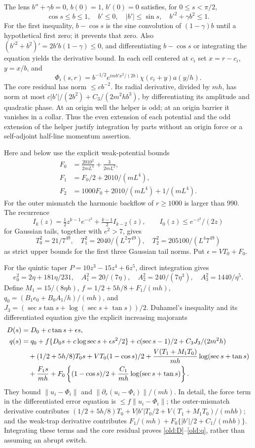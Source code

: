 \documentclass[11pt]{article}
\theoremstyle{definition}\newtheorem{definition}[theorem]{Definition}
\theoremstyle{remark}\newtheorem{remark}[theorem]{Remark}
\begin{document}
The lens $b''+\gamma b=0$, $b(0)=1$, $b'(0)=0$ satisfies, for
$0\leq s<\pi/2$,
\[
 \cos s\leq b\leq1,\quad b'\leq0,\quad |b'|\leq\sin s,
 \quad b'^2+\gamma b^2\leq1.
\]
For the first inequality, $b-\cos s$ is the sine convolution of
$(1-\gamma)b$ until a hypothetical first zero; it prevents that zero.
Also $(b'^2+b^2)'=2b'b(1-\gamma)\leq0$, and differentiating $b-\cos s$
or integrating the equation yields the derivative bound.
In each cell centered at $c_i$ set $x=r-c_i$, $y=x/b$, and
\[
 \Phi_i(s,r)=b^{-1/2}e^{im b'x^2/(2b)}
             \chi(c_i+y)a(y/h).
\]
The core residual has norm $\leq cb^{-2}$. Its radial derivative,
divided by $mh$, has norm at most
$ c|b'|/(2b^2)+C_3/(2m^2hb^3)$, by differentiating its amplitude and
quadratic phase. At an origin well the helper is odd; at an origin
barrier it vanishes in a collar. Thus the even extension of each potential
and the odd extension of the helper justify integration by parts without
an origin force or a self-adjoint half-line momentum assertion.

Here and below use the explicit weak-potential bounds
\begin{align*}
 F_0&=\frac{2010^2}{2mL^4}+\frac{3}{2mL^2},\\
 F_1&=F_0/2+2010/(mL^4),\\
 F_2&=1000F_0+2010/(mL^4)+1/(mL^4).
\end{align*}
For the outer mismatch the harmonic backflow of $r\geq1000$ is
larger than $990$. The recurrence
\[
 I_k(z)=\tfrac12z^{k-1}e^{-z^2}+\tfrac{k-1}{2}I_{k-2}(z),
 \qquad I_0(z)\leq e^{-z^2}/(2z)
\]
for Gaussian tails, together with $e^2>7$, gives
\[
 T_0^2=21/7^{49},\quad T_1^2=2040/(L^2 7^{49}),\quad
 T_2^2=205100/(L^4 7^{49})
\]
as strict upper bounds for the first three Gaussian tail norms.
Put $\epsilon=VT_0+F_0$.

For the quintic taper $P=10z^3-15z^4+6z^5$, direct integration gives
\[
 e_0^2=2\eta+181\eta/231,\quad A_1^2=20/(7\eta),\quad
 A_2^2=240/(7\eta^3),\quad A_3^2=1440/\eta^5.
\]
Define $M_1=15/(8\eta h)$,
$f=1/2+5h/8+F_1/(mh)$,
$q_0=(B_1e_0+B_0A_1/h)/(mh)$, and
$J_3=(\sec s\tan s+\log(\sec s+\tan s))/2$.
Duhamel's inequality and its differentiated equation give the explicit
increasing majorants
\begin{align}
 D(s)&=D_0+c\tan s+\epsilon s,\label{old:D}\\
 q(s)&=q_0+f\{D_0s+c\log\sec s+\epsilon s^2/2\}
       +c(\sec s-1)/2+C_3J_3/(2m^2h)\notag\\
 &\quad +(1/2+5h/8)T_0s+VT_0(1-\cos s)/2
       +\frac{V(T_1+M_1T_0)}{mh}\log(\sec s+\tan s)\notag\\
 &\quad +\frac{F_1s}{mh}
       +F_0\left\{(1-\cos s)/2+\frac{C_1}{mh}
                                      \log(\sec s+\tan s)\right\}.
 \label{old:q}
\end{align}
They bound $\|u_i-\Phi_i\|$ and
$\|\partial_r(u_i-\Phi_i)\|/(mh)$. In detail, the force term in the
differentiated error equation is $\leq f\|u_i-\Phi_i\|$;
the outer-mismatch derivative contributes
$(1/2+5h/8)T_0+V|b'|T_0/2+V(T_1+M_1T_0)/(mhb)$;
and the weak-trap derivative contributes
$F_1/(mh)+F_0\{|b'|/2+C_1/(mhb)\}$.
Integrating these terms and the core residual proves
\eqref{old:D}--\eqref{old:q}, rather than assuming an abrupt switch.
\end{document}
